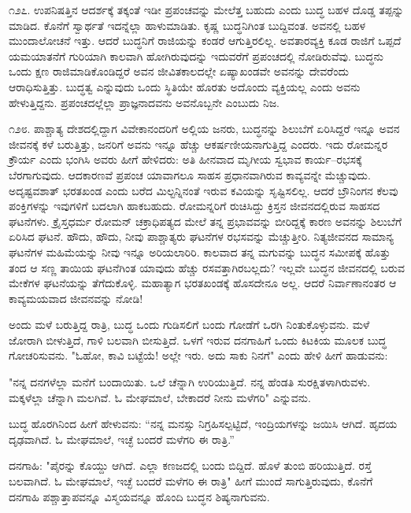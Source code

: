 ೧೨೭. ಉಪನಿಷತ್ತಿನ ಆದರ್ಶಕ್ಕೆ ತಕ್ಕಂತೆ ಇಡೀ ಪ್ರಪಂಚವನ್ನು ಮೇಲೆತ್ತ ಬಹುದು ಎಂದು ಬುದ್ಧ ಬಹಳ ದೊಡ್ಡ ತಪ್ಪನ್ನು ಮಾಡಿದ. ಕೊನೆಗೆ ಸ್ವಾರ್ಥತೆ ಇದನ್ನೆಲ್ಲಾ ಹಾಳುಮಾಡಿತು. ಕೃಷ್ಣ ಬುದ್ಧನಿಗಿಂತ ಬುದ್ದಿವಂತ. ಅವನಲ್ಲಿ ಬಹಳ ಮುಂದಾಲೋಚನೆ ಇತ್ತು. ಆದರೆ ಬುದ್ಧನಿಗೆ ರಾಜಿಯನ್ನು ಕಂಡರೆ ಆಗುತ್ತಿರಲಿಲ್ಲ. ಅವತಾರವ್ಯಕ್ತಿ ಕೂಡ ರಾಜಿಗೆ ಒಪ್ಪದೆ ಯಮಯಾತನೆಗೆ ಗುರಿಯಾಗಿ ಕಾಲವಾಗಿ ಹೋಗಿರುವುದನ್ನು ಇದುವರೆಗೆ ಪ್ರಪಂಚದಲ್ಲಿ ನೋಡಿರುವೆವು. ಬುದ್ಧನು ಒಂದು ಕ್ಷಣ ರಾಜಿಮಾಡಿಕೊಂಡಿದ್ದರೆ ಅವನ ಜೀವಿತಕಾಲದಲ್ಲೇ ಏಷ್ಯಾಖಂಡವೇ ಅವನನ್ನು ದೇವರೆಂದು ಆರಾಧಿಸುತ್ತಿತ್ತು. ಬುದ್ಧತ್ವ ಎನ್ನುವುದು ಒಂದು ಸ್ಥಿತಿಯೇ ಹೊರತು ಅದೊಂದು ವ್ಯಕ್ತಿಯಲ್ಲ ಎಂದು ಅವನು ಹೇಳುತ್ತಿದ್ದನು. ಪ್ರಪಂಚದಲ್ಲೆಲ್ಲಾ ಪ್ರಾಜ್ಞನಾದವನು ಅವನೊಬ್ಬನೇ ಎಂಬುದು ನಿಜ.

೧೨೮. ಪಾಶ್ಚಾತ್ಯ ದೇಶದಲ್ಲಿದ್ದಾಗ ವಿವೇಕಾನಂದರಿಗೆ ಅಲ್ಲಿಯ ಜನರು, ಬುದ್ಧನನ್ನು ಶಿಲುಬೆಗೆ ಏರಿಸಿದ್ದರೆ ಇನ್ನೂ ಅವನ ಜೀವನಕ್ಕೆ ಕಳೆ ಬರುತ್ತಿತ್ತು, ಜನರಿಗೆ ಅವನು ಇನ್ನೂ ಹೆಚ್ಚು ಆಕರ್ಷಣೀಯನಾಗುತ್ತಿದ್ದ ಎಂದರು. ಇದು ರೋಮನ್ನರ ಕ್ರೌರ್ಯ ಎಂದು ಭಂಗಿಸಿ ಅವರು ಹೀಗೆ ಹೇಳಿದರು: ಅತಿ ಹೀನವಾದ ಮೃಗೀಯ ಸ್ವಭಾವ ಕಾರ್ಯ–ರಭಸಕ್ಕೆ ಬೆರಗಾಗುವುದು. ಆದಕಾರಣವೆ ಪ್ರಪಂಚ ಯಾವಾಗಲೂ ಸಾಹಸ ಪ್ರಧಾನವಾಗಿರುವ ಕಾವ್ಯವನ್ನೇ ಮೆಚ್ಚುವುದು. ಅದೃಷ್ಟವಶಾತ್ ಭರತಖಂಡ  ಎಂದು ಬರೆದ ಮಿಲ್ಟನ್ನಿನಂತೆ ಇರುವ ಕವಿಯನ್ನು ಸೃಷ್ಟಿಸಲಿಲ್ಲ. ಆದರೆ ಬ್ರೌನಿಂಗನ ಕೆಲವು ಪಂಕ್ತಿಗಳನ್ನು ಇವುಗಳಿಗೆ ಬದಲಾಗಿ ಹಾಕಬಹುದು. ರೋಮನ್ನರಿಗೆ ರುಚಿಸಿದ್ದು ಕ್ರಿಸ್ತನ ಜೀವನದಲ್ಲಿರುವ ಸಾಹಸದ ಘಟನೆಗಳು. ಕ್ರೈಸ್ತಧರ್ಮ ರೋಮನ್ ಚಕ್ರಾಧಿಪತ್ಯದ ಮೇಲೆ ತನ್ನ ಪ್ರಭಾವವನ್ನು ಬೀರಿದ್ದಕ್ಕೆ ಕಾರಣ ಅವನನ್ನು ಶಿಲುಬೆಗೆ ಏರಿಸಿದ ಘಟನೆ. ಹೌದು, ಹೌದು, ನೀವು ಪಾಶ್ಚಾತ್ಯರು ಘಟನೆಗಳ ರಭಸವನ್ನು ಮೆಚ್ಚುತ್ತೀರಿ. ನಿತ್ಯಜೀವನದ ಸಾಮಾನ್ಯ ಘಟನೆಗಳ ಮಹಿಮೆಯನ್ನು ನೀವು ಇನ್ನೂ ಅರಿಯಲಾರಿರಿ. ಕಾಲವಾದ ತನ್ನ ಮಗುವನ್ನು ಬುದ್ಧನ ಸಮೀಪಕ್ಕೆ ಹೊತ್ತು ತಂದ ಆ ಸಣ್ಣ ತಾಯಿಯ ಘಟನೆಗಿಂತ ಯಾವುದು ಹೆಚ್ಚು ರಸವತ್ತಾಗಿರಬಲ್ಲದು? ಇಲ್ಲವೇ ಬುದ್ಧನ ಜೀವನದಲ್ಲಿ ಬರುವ ಮೇಕೆಗಳ ಘಟನೆಯನ್ನು ತೆಗೆದುಕೊಳ್ಳಿ. ಮಹಾತ್ಯಾಗ ಭರತಖಂಡಕ್ಕೆ ಹೊಸದೇನೂ ಅಲ್ಲ. ಆದರೆ ನಿರ್ವಾಣಾನಂತರ ಆ ಕಾವ್ಯಮಯವಾದ ಜೀವನವನ್ನು ನೋಡಿ!

ಅಂದು ಮಳೆ ಬರುತ್ತಿದ್ದ ರಾತ್ರಿ, ಬುದ್ಧ ಒಂದು ಗುಡಿಸಲಿಗೆ ಬಂದು ಗೋಡೆಗೆ ಒರಗಿ ನಿಂತುಕೊಳ್ಳುವನು. ಮಳೆ ಜೋರಾಗಿ ಬೀಳುತ್ತಿದೆ, ಗಾಳಿ ಬಲವಾಗಿ ಬೀಸುತ್ತಿದೆ. ಒಳಗೆ ಇರುವ ದನಗಾಹಿಗೆ ಒಂದು ಕಿಟಕಿಯ ಮೂಲಕ ಬುದ್ಧ ಗೋಚರಿಸುವನು. "ಓಹೋ, ಕಾವಿ ಬಟ್ಟೆಯೆ! ಅಲ್ಲೇ ಇರು. ಅದು ಸಾಕು ನಿನಗೆ" ಎಂದು ಹೇಳಿ ಹೀಗೆ ಹಾಡುವನು:

"ನನ್ನ ದನಗಳೆಲ್ಲಾ ಮನೆಗೆ ಬಂದಾಯಿತು. ಒಲೆ ಚೆನ್ನಾಗಿ ಉರಿಯುತ್ತಿದೆ. ನನ್ನ ಹೆಂಡತಿ ಸುರಕ್ಷಿತಳಾಗಿರುವಳು. ಮಕ್ಕಳೆಲ್ಲಾ ಚೆನ್ನಾಗಿ ಮಲಗಿವೆ. ಓ ಮೇಘಮಾಲೆ, ಬೇಕಾದರೆ ನೀನು ಮಳೆಗರಿ" ಎನ್ನುವನು.

ಬುದ್ಧ ಹೊರಗಿನಿಂದ ಹೀಗೆ ಹೇಳುವನು: “ನನ್ನ ಮನಸ್ಸು ನಿಗ್ರಹಿಸಲ್ಪಟ್ಟಿದೆ, ಇಂದ್ರಿಯಗಳನ್ನು ಜಯಿಸಿ ಆಗಿದೆ. ಹೃದಯ ದೃಢವಾಗಿದೆ. ಓ ಮೇಘಮಾಲೆ, ಇಚ್ಛೆ ಬಂದರೆ ಮಳೆಗರಿ ಈ ರಾತ್ರಿ.”

ದನಗಾಹಿ: "ಪೈರನ್ನು ಕೊಯ್ದು ಆಗಿದೆ. ಎಲ್ಲಾ ಕಣಜದಲ್ಲಿ ಬಂದು ಬಿದ್ದಿದೆ. ಹೊಳೆ ತುಂಬಿ ಹರಿಯುತ್ತಿದೆ. ರಸ್ತೆ ಬಲವಾಗಿದೆ. ಓ ಮೇಘಮಾಲೆ, ಇಚ್ಛೆ ಬಂದರೆ ಮಳೆಗರಿ ಈ ರಾತ್ರಿ" ಹೀಗೆ ಮುಂದೆ ಸಾಗುತ್ತಿರುವುದು, ಕೊನೆಗೆ ದನಗಾಹಿ ಪಶ್ಚಾತ್ತಾಪವನ್ನೂ ವಿಸ್ಮಯವನ್ನೂ ಹೊಂದಿ ಬುದ್ಧನ ಶಿಷ್ಯನಾಗುವನು.

